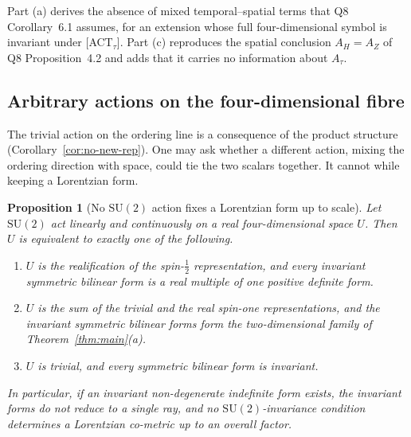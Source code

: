 \documentclass[12pt,a4paper]{article}
\newtheorem{proposition}[theorem]{Proposition}
\newcommand{\SU}{\mathrm{SU}}
\begin{document}
      Part (a) derives the absence of mixed temporal--spatial terms that Q8 Corollary~6.1 assumes, for an extension
      whose full four-dimensional symbol is invariant under [ACT$_\tau$].
      Part (c) reproduces the spatial conclusion $A_H = A_Z$ of Q8 Proposition~4.2 and adds that it carries no
      information about $A_\tau$.

    \subsection{Arbitrary actions on the four-dimensional fibre}

      The trivial action on the ordering line is a consequence of the product structure
      (Corollary~\ref{cor:no-new-rep}).
      One may ask whether a different action, mixing the ordering direction with space, could tie the two scalars
      together.
      It cannot while keeping a Lorentzian form.

      \begin{proposition}[No $\SU(2)$ action fixes a Lorentzian form up to scale]
        \label{prop:any-action}
        Let $\SU(2)$ act linearly and continuously on a real four-dimensional space $U$.
        Then $U$ is equivalent to exactly one of the following.
        \begin{enumerate}
          \item[(i)] $U$ is the realification of the spin-$\tfrac12$ representation, and every invariant symmetric
          bilinear form is a real multiple of one positive definite form.
          \item[(ii)] $U$ is the sum of the trivial and the real spin-one representations, and the invariant symmetric
          bilinear forms form the two-dimensional family of Theorem~\ref{thm:main}\textup{(a)}.
          \item[(iii)] $U$ is trivial, and every symmetric bilinear form is invariant.
        \end{enumerate}
        In particular, if an invariant non-degenerate indefinite form exists, the invariant forms do not reduce to a
        single ray, and no $\SU(2)$-invariance condition determines a Lorentzian co-metric up to an overall factor.
      \end{proposition}
\end{document}

